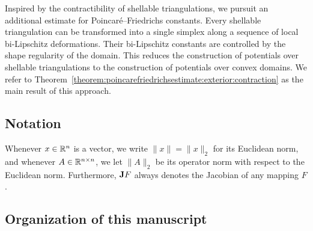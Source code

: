 \documentclass[10pt,a4paper]{article}
\begin{document}
Inspired by the contractibility of shellable triangulations, we pursuit an additional estimate for Poincar\'e--Friedrichs constants. 
Every shellable triangulation can be transformed into a single simplex along a sequence of local bi-Lipschitz deformations. 
Their bi-Lipschitz constants are controlled by the shape regularity of the domain. 
This reduces the construction of potentials over shellable triangulations to the construction of potentials over convex domains.
We refer to Theorem~\ref{theorem:poincarefriedrichsestimate:exterior:contraction} as the main result of this approach. 
















\subsection{Notation}

Whenever $x \in {\mathbb R}^{n}$ is a vector, we write $\|x\| = \|x\|_{2}$ for its Euclidean norm, 
and whenever $A \in {\mathbb R}^{n \times n}$, we let $\| A \|_{2}$ be its operator norm with respect to the Euclidean norm. 
Furthermore, ${\mathbf{J}} F$ always denotes the Jacobian of any mapping $F$. 




\subsection{Organization of this manuscript}
\end{document}
